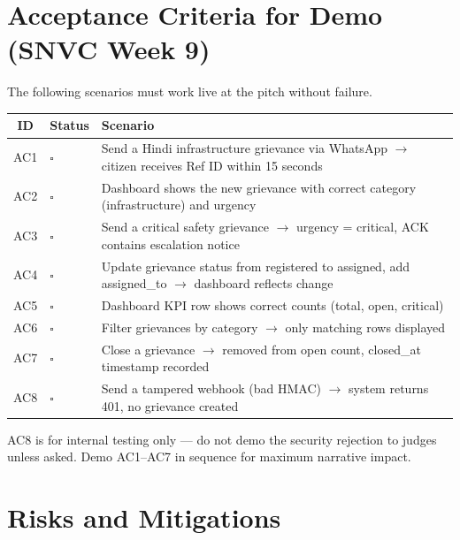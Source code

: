 \documentclass[11pt, a4paper]{article}
\begin{document}
\newpage

\section{Acceptance Criteria for Demo (SNVC Week 9)}

The following scenarios must work live at the pitch without failure.

\begin{tabularx}{\linewidth}{clX}
\toprule
\textbf{ID} & \textbf{Status} & \textbf{Scenario} \\
\midrule
AC1 & $\square$ & Send a Hindi infrastructure grievance via WhatsApp $\to$ citizen receives Ref ID within 15 seconds \\
AC2 & $\square$ & Dashboard shows the new grievance with correct category (infrastructure) and urgency \\
AC3 & $\square$ & Send a critical safety grievance $\to$ urgency = critical, ACK contains escalation notice \\
AC4 & $\square$ & Update grievance status from registered to assigned, add assigned\_to $\to$ dashboard reflects change \\
AC5 & $\square$ & Dashboard KPI row shows correct counts (total, open, critical) \\
AC6 & $\square$ & Filter grievances by category $\to$ only matching rows displayed \\
AC7 & $\square$ & Close a grievance $\to$ removed from open count, closed\_at timestamp recorded \\
AC8 & $\square$ & Send a tampered webhook (bad HMAC) $\to$ system returns 401, no grievance created \\
\bottomrule
\end{tabularx}

\vspace{1em}
\begin{notebox}
AC8 is for internal testing only --- do not demo the security rejection to judges unless asked. Demo AC1--AC7 in sequence for maximum narrative impact.
\end{notebox}

\newpage

\section{Risks and Mitigations}
\end{document}

